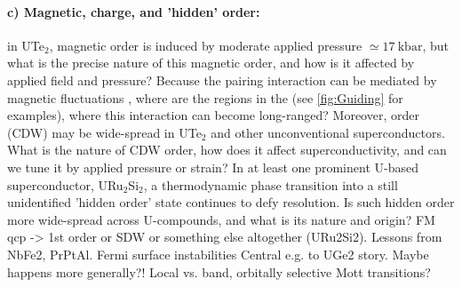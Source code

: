\paragraph{c) Magnetic, charge, and 'hidden' order:} in UTe$_2$, magnetic order is induced by moderate applied pressure $\simeq \SI{17}{\kilo\bar}$, but what is the precise nature of this magnetic order, and how is it affected by applied field and pressure? Because the pairing interaction can be mediated by magnetic fluctuations \cite{monthoux07}, where are the regions in the  (see \autoref{fig:Guiding} for examples), where this interaction can become long-ranged? Moreover,  order (CDW) may be wide-spread in UTe$_2$ and other unconventional superconductors. What is the nature of CDW order, how does it affect superconductivity, and can we tune it by applied pressure or strain? In at least one prominent U-based superconductor, URu$_2$Si$_2$, a thermodynamic phase transition into a still unidentified 'hidden order' state continues to defy resolution. Is such hidden order more wide-spread across U-compounds, and what is its nature and origin?
FM qcp -> 1st order or SDW or something else altogether (URu2Si2). 
Lessons from NbFe2, PrPtAl. Fermi surface instabilities
Central e.g. to UGe2 story. Maybe happens more generally?! Local vs. band, orbitally selective Mott transitions? 









